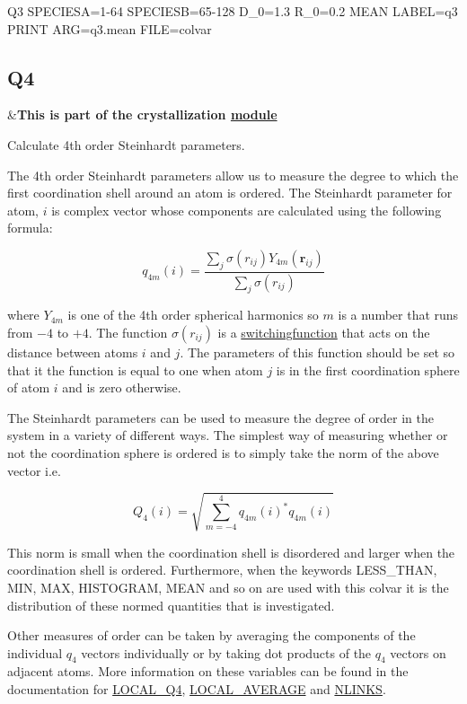 \begin{DoxyVerb}Q3 SPECIESA=1-64 SPECIESB=65-128 D_0=1.3 R_0=0.2 MEAN LABEL=q3
PRINT ARG=q3.mean FILE=colvar
\end{DoxyVerb}
 \hypertarget{Q4}{}\subsection{Q4}\label{Q4}
\begin{TabularC}{2}
\hline
&{\bfseries  This is part of the crystallization \hyperlink{mymodules}{module }}   \\
\end{TabularC}
Calculate 4th order Steinhardt parameters.

The 4th order Steinhardt parameters allow us to measure the degree to which the first coordination shell around an atom is ordered. The Steinhardt parameter for atom, $i$ is complex vector whose components are calculated using the following formula\+:

\[ q_{4m}(i) = \frac{\sum_j \sigma( r_{ij} ) Y_{4m}(\mathbf{r}_{ij}) }{\sum_j \sigma( r_{ij} ) } \]

where $Y_{4m}$ is one of the 4th order spherical harmonics so $m$ is a number that runs from $-4$ to $+4$. The function $\sigma( r_{ij} )$ is a \hyperlink{switchingfunction}{switchingfunction} that acts on the distance between atoms $i$ and $j$. The parameters of this function should be set so that it the function is equal to one when atom $j$ is in the first coordination sphere of atom $i$ and is zero otherwise.

The Steinhardt parameters can be used to measure the degree of order in the system in a variety of different ways. The simplest way of measuring whether or not the coordination sphere is ordered is to simply take the norm of the above vector i.\+e.

\[ Q_4(i) = \sqrt{ \sum_{m=-4}^4 q_{4m}(i)^{*} q_{4m}(i) } \]

This norm is small when the coordination shell is disordered and larger when the coordination shell is ordered. Furthermore, when the keywords L\+E\+S\+S\+\_\+\+T\+H\+A\+N, M\+I\+N, M\+A\+X, H\+I\+S\+T\+O\+G\+R\+A\+M, M\+E\+A\+N and so on are used with this colvar it is the distribution of these normed quantities that is investigated.

Other measures of order can be taken by averaging the components of the individual $q_4$ vectors individually or by taking dot products of the $q_{4}$ vectors on adjacent atoms. More information on these variables can be found in the documentation for \hyperlink{LOCAL_Q4}{L\+O\+C\+A\+L\+\_\+\+Q4}, \hyperlink{LOCAL_AVERAGE}{L\+O\+C\+A\+L\+\_\+\+A\+V\+E\+R\+A\+G\+E} and \hyperlink{NLINKS}{N\+L\+I\+N\+K\+S}.

